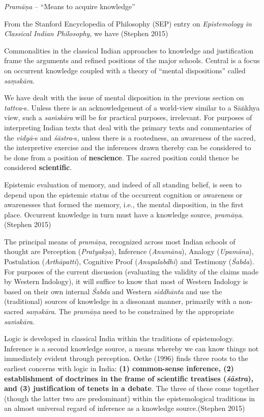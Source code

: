 {\sl Pramāṇa} -- ``Means to acquire knowledge''

From the Stanford Encyclopedia of Philosophy (SEP) entry on {\sl Epistemology in Classical Indian Philosophy}, we have (Stephen 2015)
\begin{myquote}
Commonalities in the classical Indian approaches to knowledge and justification frame the arguments and refined positions of the major schools. Central is a focus on occurrent knowledge coupled with a theory of ``mental dispositions'' called {\sl saṃskāra}. 
\end{myquote}

We have dealt with the issue of mental disposition in the previous section on {\sl tattva}-s. Unless there is an acknowledgement of a world-view similar to a Sāṅkhya view, such a {\sl saṁskāra} will be for practical purposes, irrelevant. For purposes of interpreting Indian texts that deal with the primary texts and commentaries of the {\sl vidyā}-s and {\sl śāstra}-s, unless there is a rootedness, an awareness of the sacred, the interpretive exercise and the inferences drawn thereby can be considered to be done from a position of {\bf nescience}. The sacred position could thence be considered {\bf scientific}.
\begin{myquote}
Epistemic evaluation of memory, and indeed of all standing belief, is seen to depend upon the epistemic status of the occurrent cognition or awareness or awarenesses that formed the memory, i.e., the mental disposition, in the first place. Occurrent knowledge in turn must have a knowledge source, {\sl pramāṇa}.\hfill (Stephen 2015)
\end{myquote}

The principal means of {\sl pramāṇa}, recognized across most Indian schools of thought are Perception ({\sl Pratyakṣa}), Inference ({\sl Anumāna}), Analogy ({\sl Upamāna}), Postulation ({\sl Arthāpatti}), Cognitive Proof ({\sl Anupalabdhi}) and Testimony ({\sl Śabda}). For purposes of the current discussion (evaluating the validity of the claims made by Western Indology), it will suffice to know that most of Western Indology is based on their own internal {\sl Śabda} and Western {\sl siddhānta} and use the (traditional) sources of knowledge in a dissonant manner,  primarily with a non-sacred {\sl saṃ\-skāra}. The {\sl pramāṇa} need to be constrained by the appropriate {\sl saṁskāra}.
\begin{myquote}
Logic is developed in classical India within the traditions of epistemology. Inference is a second knowledge source, a means whereby we can know things not immediately evident through perception. Oetke (1996) finds three roots to the earliest concerns with logic in India: {\bf (1) common-sense inference, (2) establishment of doctrines in the frame of scientific treatises ({{\sl\bfseries śāstra}\relax}), and (3) justification of tenets in a debate}. The three of these come together (though the latter two are predominant) within the epistemological traditions in an almost universal regard of inference as a knowledge source.\hfill (Stephen 2015)
\end{myquote}

